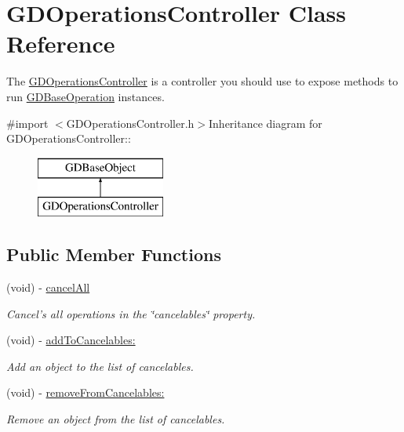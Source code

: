 \hypertarget{interface_g_d_operations_controller}{
\section{GDOperationsController Class Reference}
\label{interface_g_d_operations_controller}
}


The \hyperlink{interface_g_d_operations_controller}{GDOperationsController} is a controller you should use to expose methods to run \hyperlink{interface_g_d_base_operation}{GDBaseOperation} instances.  


{\ttfamily \#import $<$GDOperationsController.h$>$}Inheritance diagram for GDOperationsController::\begin{figure}[H]
\begin{center}
\leavevmode
\includegraphics[height=2cm]{interface_g_d_operations_controller}
\end{center}
\end{figure}
\subsection*{Public Member Functions}
\begin{DoxyCompactItemize}
\item 
\hypertarget{interface_g_d_operations_controller_a083affae2df92d8426d7824cfd3aa4c5}{
(void) -\/ \hyperlink{interface_g_d_operations_controller_a083affae2df92d8426d7824cfd3aa4c5}{cancelAll}}
\label{interface_g_d_operations_controller_a083affae2df92d8426d7824cfd3aa4c5}

\begin{DoxyCompactList}\small\item\em Cancel's all operations in the \char`\"{}cancelables\char`\"{} property. \item\end{DoxyCompactList}\item 
(void) -\/ \hyperlink{interface_g_d_operations_controller_ac387e516835185c6e49528528d8455ce}{addToCancelables:}
\begin{DoxyCompactList}\small\item\em Add an object to the list of cancelables. \item\end{DoxyCompactList}\item 
(void) -\/ \hyperlink{interface_g_d_operations_controller_aa4811a04380d3870e3827ae33db9ac35}{removeFromCancelables:}
\begin{DoxyCompactList}\small\item\em Remove an object from the list of cancelables. \item\end{DoxyCompactList}\end{DoxyCompactItemize}
